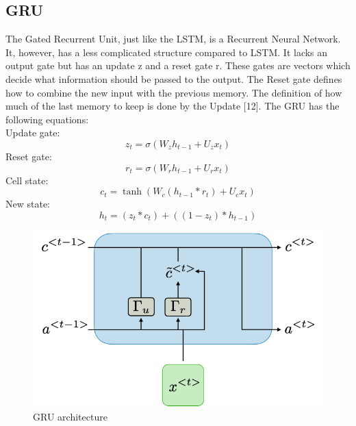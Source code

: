 \documentclass{ieeeojies}
\begin{document}
\subsection{GRU}
The Gated Recurrent Unit, just like the LSTM, is a Recurrent
Neural Network. It, however, has a less complicated structure
compared to LSTM. It lacks an output gate but has an update z
and a reset gate r. These gates are vectors which decide what
information should be passed to the output. 
The Reset gate defines how to combine the new input with the
previous memory. The definition of how much of the last memory
to keep is done by the Update [12]. The GRU has the following
equations:\cite{Yamak}
\\
Update gate:
\begin{equation}
z_t = \sigma(W_z h_{t-1} + U_z x_t)
\end{equation}
Reset gate:
\begin{equation}
r_t = \sigma(W_r h_{t-1} + U_r x_t)
\end{equation}
Cell state:
\begin{equation}
c_t = \tanh(W_c (h_{t-1} \ast r_t) + U_c x_t)
\end{equation}
New state:
\begin{equation}
h_t = (z_t \ast c_t) + ((1 - z_t) \ast h_{t-1})
\end{equation}
\begin{figure}[H]
    \centering
\begin{minipage}{0.4\textwidth}
        \centering
        \includegraphics[width=\textwidth]{bibliography/Figure/gru-ltr.png}
        \caption{GRU architecture}
        \label{fig:3}
\end{minipage}
\end{figure}
\end{document}
